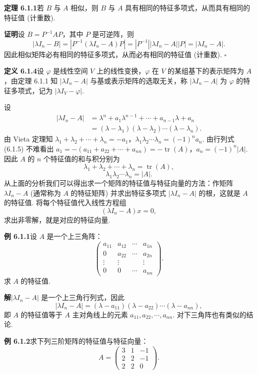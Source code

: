 \documentclass[UTF8,12pt,a4paper,fontset=fandol]{ctexart}
\begin{document}
\noindent\textbf{定理 6.1.1}\quad 若 $B$ 与 $A$ 相似，则 $B$ 与 $A$ 具有相同的特征多项式，从而具有相同的特征值 (计重数).

\noindent\textbf{证明}\quad 设 $B=P^{-1}AP$，其中 $P$ 是可逆阵，则
\[
|\lambda I_n-B|=|P^{-1}(\lambda I_n-A)P|=|P^{-1}||\lambda I_n-A||P|=|\lambda I_n-A|.
\]
因此相似矩阵必有相同的特征多项式，从而必有相同的特征值 (计重数). $\square$

\noindent\textbf{定义 6.1.4}\quad 设 $\varphi$ 是线性空间 $V$ 上的线性变换，$\varphi$ 在 $V$ 的某组基下的表示矩阵为 $A$，由定理 6.1.1 知 $|\lambda I_n-A|$ 与基或表示矩阵的选取无关，称 $|\lambda I_n-A|$ 为 $\varphi$ 的特征多项式，记为 $|\lambda I_V-\varphi|$.

设
\[
\begin{aligned}
|\lambda I_n-A|&=\lambda^n+a_1\lambda^{n-1}+\cdots+a_{n-1}\lambda+a_n\\
&=(\lambda-\lambda_1)(\lambda-\lambda_2)\cdots(\lambda-\lambda_n).
\end{aligned}
\]
由 Vieta 定理知 $\lambda_1+\lambda_2+\cdots+\lambda_n=-a_1$，$\lambda_1\lambda_2\cdots\lambda_n=(-1)^na_n$. 由行列式 (6.1.5) 不难看出 $a_1=-(a_{11}+a_{22}+\cdots+a_{nn})=-\operatorname{tr}(A)$，$a_n=(-1)^n|A|$. 因此 $A$ 的 $n$ 个特征值的和与积分别为
\[
\lambda_1+\lambda_2+\cdots+\lambda_n=\operatorname{tr}(A),
\]
\[
\lambda_1\lambda_2\cdots\lambda_n=|A|.
\]
从上面的分析我们可以得出求一个矩阵的特征值与特征向量的方法：作矩阵 $\lambda I_n-A$ (通常称为 $A$ 的特征矩阵) 并求出特征多项式 $|\lambda I_n-A|$ 的根，这就是 $A$ 的特征值. 将每个特征值代入线性方程组
\[
(\lambda I_n-A)x=0,
\]
求出非零解，就是对应的特征向量.

\noindent\textbf{例 6.1.1}\quad 设 $A$ 是一个上三角阵：
\[
\left(\begin{array}{cccc}
a_{11} & a_{12} & \cdots & a_{1n}\\
0 & a_{22} & \cdots & a_{2n}\\
\vdots & \vdots & & \vdots\\
0 & 0 & \cdots & a_{nn}
\end{array}\right).
\]
求 $A$ 的特征值.

\noindent\textbf{解}\quad $|\lambda I_n-A|$ 是一个上三角行列式，因此
\[
|\lambda I_n-A|=(\lambda-a_{11})(\lambda-a_{22})\cdots(\lambda-a_{nn}),
\]
即 $A$ 的特征值等于 $A$ 主对角线上的元素 $a_{11},a_{22},\cdots,a_{nn}$. 对下三角阵也有类似的结论.

\noindent\textbf{例 6.1.2}\quad 求下列三阶矩阵的特征值与特征向量：
\[
A=\left(\begin{array}{ccc}
3 & 1 & -1\\
2 & 2 & -1\\
2 & 2 & 0
\end{array}\right).
\]
\end{document}
